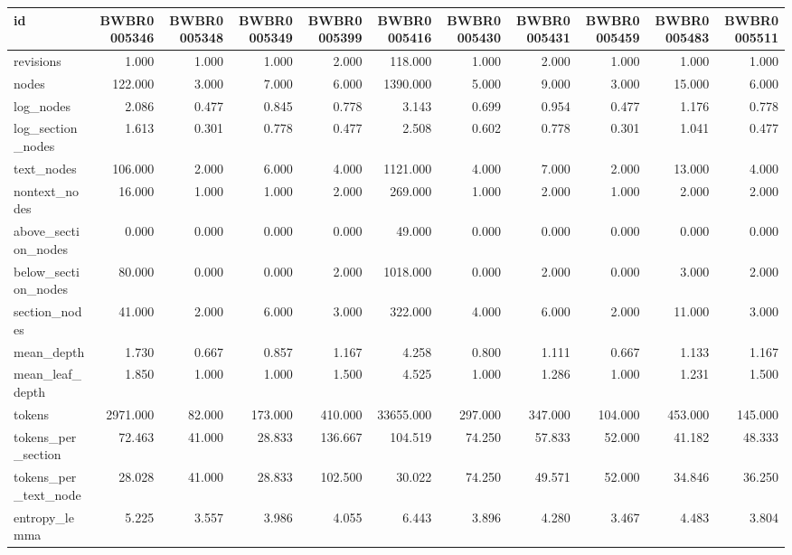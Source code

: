 \begin{tabular}{lrrrrrrrrrr}
\toprule
id & BWBR0005346 & BWBR0005348 & BWBR0005349 & BWBR0005399 & BWBR0005416 & BWBR0005430 & BWBR0005431 & BWBR0005459 & BWBR0005483 & BWBR0005511 \\
\midrule
revisions & 1.000 & 1.000 & 1.000 & 2.000 & 118.000 & 1.000 & 2.000 & 1.000 & 1.000 & 1.000 \\
\cline{1-11}
nodes & 122.000 & 3.000 & 7.000 & 6.000 & 1390.000 & 5.000 & 9.000 & 3.000 & 15.000 & 6.000 \\
\cline{1-11}
log\_nodes & 2.086 & 0.477 & 0.845 & 0.778 & 3.143 & 0.699 & 0.954 & 0.477 & 1.176 & 0.778 \\
\cline{1-11}
log\_section\_nodes & 1.613 & 0.301 & 0.778 & 0.477 & 2.508 & 0.602 & 0.778 & 0.301 & 1.041 & 0.477 \\
\cline{1-11}
text\_nodes & 106.000 & 2.000 & 6.000 & 4.000 & 1121.000 & 4.000 & 7.000 & 2.000 & 13.000 & 4.000 \\
\cline{1-11}
nontext\_nodes & 16.000 & 1.000 & 1.000 & 2.000 & 269.000 & 1.000 & 2.000 & 1.000 & 2.000 & 2.000 \\
\cline{1-11}
above\_section\_nodes & 0.000 & 0.000 & 0.000 & 0.000 & 49.000 & 0.000 & 0.000 & 0.000 & 0.000 & 0.000 \\
\cline{1-11}
below\_section\_nodes & 80.000 & 0.000 & 0.000 & 2.000 & 1018.000 & 0.000 & 2.000 & 0.000 & 3.000 & 2.000 \\
\cline{1-11}
section\_nodes & 41.000 & 2.000 & 6.000 & 3.000 & 322.000 & 4.000 & 6.000 & 2.000 & 11.000 & 3.000 \\
\cline{1-11}
mean\_depth & 1.730 & 0.667 & 0.857 & 1.167 & 4.258 & 0.800 & 1.111 & 0.667 & 1.133 & 1.167 \\
\cline{1-11}
mean\_leaf\_depth & 1.850 & 1.000 & 1.000 & 1.500 & 4.525 & 1.000 & 1.286 & 1.000 & 1.231 & 1.500 \\
\cline{1-11}
tokens & 2971.000 & 82.000 & 173.000 & 410.000 & 33655.000 & 297.000 & 347.000 & 104.000 & 453.000 & 145.000 \\
\cline{1-11}
tokens\_per\_section & 72.463 & 41.000 & 28.833 & 136.667 & 104.519 & 74.250 & 57.833 & 52.000 & 41.182 & 48.333 \\
\cline{1-11}
tokens\_per\_text\_node & 28.028 & 41.000 & 28.833 & 102.500 & 30.022 & 74.250 & 49.571 & 52.000 & 34.846 & 36.250 \\
\cline{1-11}
entropy\_lemma & 5.225 & 3.557 & 3.986 & 4.055 & 6.443 & 3.896 & 4.280 & 3.467 & 4.483 & 3.804 \\

\end{tabular}

